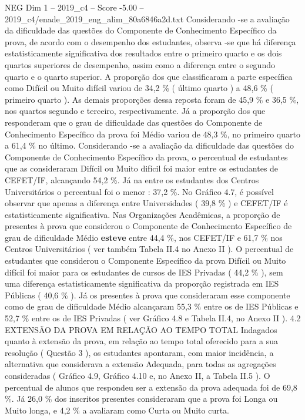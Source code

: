 \begin{textsample}{NEG Dim 1 – 2019\_c4 – Score -5.00 – 2019\_c4/enade\_2019\_eng\_alim\_80a6846a2d.txt}
Considerando -se a avaliação da dificuldade das questões do Componente de Conhecimento Específico da prova, de acordo com o desempenho dos estudantes, observa -se que há diferença estatisticamente significativa dos resultados entre o primeiro quarto e os dois quartos superiores de desempenho, assim como a diferença entre o segundo quarto e o quarto superior.
A proporção dos que classificaram a parte específica como Difícil ou Muito difícil variou de 34,2 \% ( último quarto ) a 48,6 \% ( primeiro quarto ).
As demais proporções dessa reposta foram de 45,9 \% e 36,5 \%, nos quartos segundo e terceiro, respectivamente.
Já a proporção dos que responderam que o grau de dificuldade das questões do Componente de Conhecimento Específico da prova foi Médio variou de 48,3 \%, no primeiro quarto a 61,4 \% no último.
Considerando -se a avaliação da dificuldade das questões do Componente de Conhecimento Específico da prova, o percentual de estudantes que as consideraram Difícil ou Muito difícil foi maior entre os estudantes de CEFET/IF, alcançando 54,2 \%.
Já na entre os estudantes dos Centros Universitários o percentual foi o menor : 37,2 \%.
No Gráfico 4.7, é possível observar que apenas a diferença entre Universidades ( 39,8 \% ) e CEFET/IF é estatisticamente significativa.
Nas Organizações Acadêmicas, a proporção de presentes à prova que considerou o Componente de Conhecimento Específico de grau de dificuldade Médio \textbf{esteve} entre 44,4 \%, nos CEFET/IF e 61,7 \% nos Centros Universitários ( ver também Tabela II.4 no Anexo II ).
O percentual de estudantes que considerou o Componente Específico da prova Difícil ou Muito difícil foi maior para os estudantes de cursos de IES Privadas ( 44,2 \% ), sem uma diferença estatisticamente significativa da proporção registrada em IES Públicas ( 40,6 \% ).
Já os presentes à prova que consideraram esse componente como de grau de dificuldade Médio alcançaram 55,3 \% entre os de IES Públicas e 52,7 \% entre os de IES Privadas ( ver Gráfico 4.8 e Tabela II.4, no Anexo II ). 4.2 EXTENSÃO DA PROVA EM RELAÇÃO AO TEMPO TOTAL Indagados quanto à extensão da prova, em relação ao tempo total oferecido para a sua resolução ( Questão 3 ), os estudantes apontaram, com maior incidência, a alternativa que considerava a extensão Adequada, para todas as agregações consideradas ( Gráfico 4.9, Gráfico 4.10 e, no Anexo II, a Tabela II.5 ).
O percentual de alunos que respondeu ser a extensão da prova adequada foi de 69,8 \%.
Já 26,0 \% dos inscritos presentes consideraram que a prova foi Longa ou Muito longa, e 4,2 \% a avaliaram como Curta ou Muito curta.

\end{textsample}
